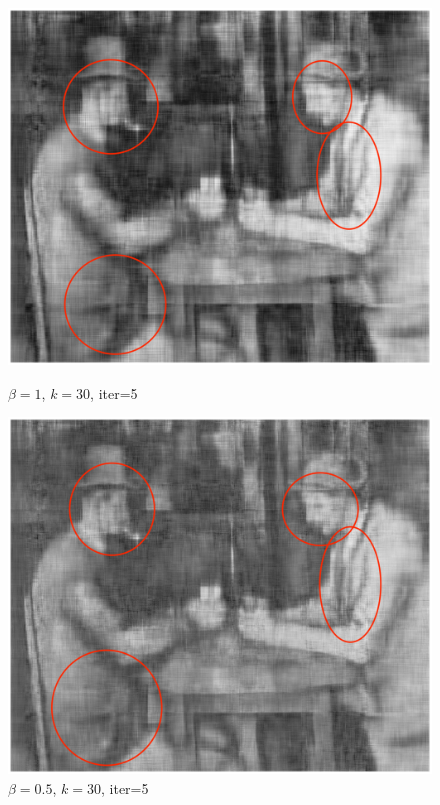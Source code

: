 \documentclass[11pt,onecolumn]{article}
\begin{document}
\begin{figure}[H]
  \centering
  \begin{minipage}{0.3\textwidth}
    \centering
    \includegraphics[width=1\textwidth]{./images/201.png}
    \caption{$\beta=1$, $k=30$, iter=5}
  \end{minipage}\hfill
  \begin{minipage}{0.3\textwidth}
    \centering
    \includegraphics[width=1\textwidth]{./images/202.png}
    \caption{$\beta=0.5$, $k=30$, iter=5}
  \end{minipage}\hfill

\end{figure}
\end{document}
